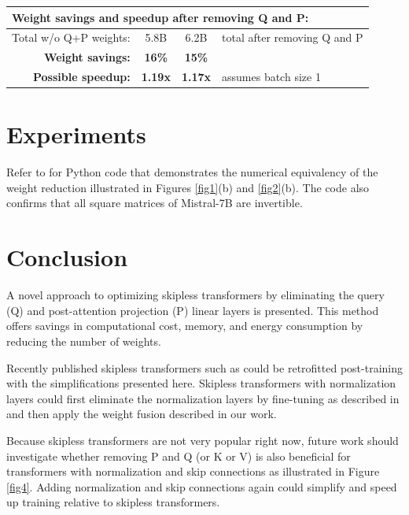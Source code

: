 \documentclass{article}
\begin{document}
\begin{center}
\begin{tabular}{|l|c|c|l|}
  \multicolumn{4}{|l|}{\textbf{Weight savings and speedup after removing Q and P:}}                         \\ \hline
  Total w/o Q+P weights:                           & 5.8B           & 6.2B   & total after removing Q and P \\ \hline
  \multicolumn{1}{|r|}{\textbf{Weight savings:}}   & \textbf{16\%}  & \textbf{15\%}  &                      \\ \hline
  \multicolumn{1}{|r|}{\textbf{Possible speedup:}} & \textbf{1.19x} & \textbf{1.17x} & assumes batch size 1 \\ \hline
\end{tabular} \end{center}
\endgroup

\section{Experiments}
Refer to \cite{tricks} for Python code that demonstrates the numerical equivalency of the weight reduction illustrated in Figures \ref{fig1}(b) and \ref{fig2}(b). The code also confirms that all square matrices of Mistral-7B are invertible.

\section{Conclusion}
A novel approach to optimizing skipless transformers by eliminating the query (Q) and post-attention projection (P) linear layers is presented. This method offers savings in computational cost, memory, and energy consumption by reducing the number of weights.

Recently published skipless transformers such as \cite{skipless2, skipless} could be retrofitted post-training with the simplifications presented here. Skipless transformers with normalization layers could first eliminate the normalization layers by fine-tuning as described in \cite{remove-norm, remove-norm2} and then apply the weight fusion described in our work.

Because skipless transformers are not very popular right now, future work should investigate whether removing P and Q (or K or V) is also beneficial for transformers with normalization and skip connections as illustrated in Figure \ref{fig4}. Adding normalization and skip connections again could simplify and speed up training relative to skipless transformers.
\end{document}
